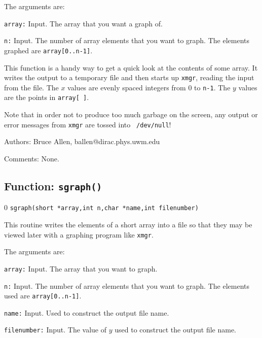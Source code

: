 The arguments are:
\begin{description}
\item{\tt array:} Input.  The array that you want a graph of.
\item{\tt n:} Input.  The number of array elements that you want to graph.
  The elements graphed are {\tt array[0..n-1]}. 
\end{description}

This function is a handy way to get a quick look at the contents of
some array.  It writes the output to a temporary file and then starts
up {\tt xmgr}, reading the input from the file.  The $x$ values are
evenly spaced integers from $0$ to {\tt n-1}.  The $y$ values are the
points in {\tt array[ ]}.

Note that in order not to produce too much garbage on the screen, any
output or error messages from {\tt xmgr} are tossed into {\tt
/dev/null}!
\begin{description}
\item{Authors:}
Bruce Allen, ballen@dirac.phys.uwm.edu
\item{Comments:}
None.
\end{description}
\clearpage

\subsection{Function: {\tt sgraph()}}
\setcounter{equation}0
{\tt sgraph(short *array,int n,char *name,int filenumber)}

This routine writes the elements of a short array into a file so that
they may be viewed later with a graphing program like {\tt xmgr}.

The arguments are:
\begin{description}
\item{\tt array:} Input.  The array that you want to graph.
\item{\tt n:} Input.  The number of array elements that you want to graph.
  The elements used are {\tt array[0..n-1]}.
\item{\tt name:} Input.  Used to construct the output file name.
\item{\tt filenumber:} Input.  The value of $y$ used to construct the output file name.
\end{description}

